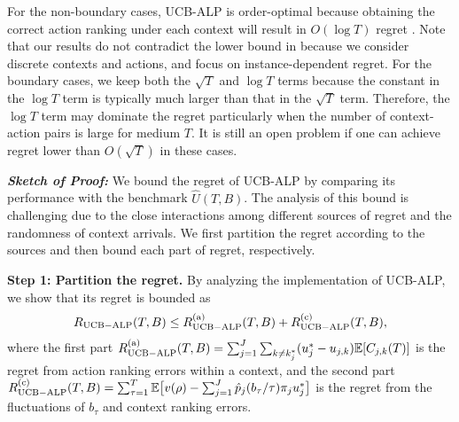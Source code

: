 For the non-boundary cases, UCB-ALP is order-optimal because obtaining the correct action ranking under each context will result in $O(\log T)$ regret \cite{Lai1985AAM}.
Note that our results do not contradict  the lower bound in \cite{Badanidiyuru2014COLT} because we consider discrete contexts and actions, and focus on instance-dependent regret. For the boundary cases, we keep both the $\sqrt{T}$ and $\log T$ terms  because the constant in the $\log T$ term is typically much larger than that in the $\sqrt{T}$ term. Therefore, the $\log T$ term may dominate the regret particularly when the number of context-action pairs is large for medium $T$.
It is still an open problem if one can achieve regret lower than $O(\sqrt{T})$ in these cases.




{\it \textbf{Sketch of Proof:}} We bound the regret of UCB-ALP by comparing its performance  with the benchmark $\widehat{U}(T,B)$. The analysis of this bound is challenging due to the close interactions among different sources of regret and the randomness of context arrivals. We first partition the regret according to the sources and then bound each part of regret, respectively.

\textbf{Step 1: Partition the regret.}
By analyzing the implementation of UCB-ALP, we show that its regret is bounded as
\vspace{-0.1cm}
\begin{equation}
R_{\rm {UCB-ALP}}(T, B) \leq R_{\rm {UCB-ALP}}^{({\rm a})}(T, B) + R_{\rm {UCB-ALP}}^{({\rm c})}(T, B),\nonumber
\end{equation}
where the first part $R_{\rm {UCB-ALP}}^{({\rm a})}(T, B) = \sum_{j=1}^J \sum_{k\neq k_j^*} (u_j^* - u_{j,k})\mathbb{E}[C_{j,k}(T)]$ is the regret from action ranking errors within a context, and the second part $R_{\rm {UCB-ALP}}^{({\rm c})}(T, B) = \sum_{\tau  = 1}^T \mathbb{E}\big[v(\rho) -\sum_{j = 1}^J \hat{p}_j(b_{\tau}/\tau) \pi_j u_j^*\big]$  is the regret from the fluctuations of $b_{\tau}$ and context ranking errors.

